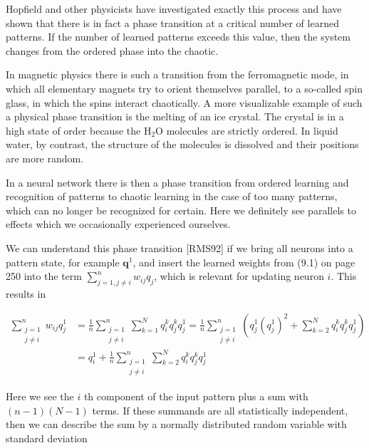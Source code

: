 \documentclass[10pt]{article}
\begin{document}
Hopfield and other physicists have investigated exactly this process and have shown that there is in fact a phase transition at a critical number of learned patterns. If the number of learned patterns exceeds this value, then the system changes from the ordered phase into the chaotic.

In magnetic physics there is such a transition from the ferromagnetic mode, in which all elementary magnets try to orient themselves parallel, to a so-called spin glass, in which the spins interact chaotically. A more visualizable example of such a physical phase transition is the melting of an ice crystal. The crystal is in a high state of order because the $\mathrm{H}_{2} \mathrm{O}$ molecules are strictly ordered. In liquid water, by contrast, the structure of the molecules is dissolved and their positions are more random.

In a neural network there is then a phase transition from ordered learning and recognition of patterns to chaotic learning in the case of too many patterns, which can no longer be recognized for certain. Here we definitely see parallels to effects which we occasionally experienced ourselves.

We can understand this phase transition [RMS92] if we bring all neurons into a pattern state, for example $\boldsymbol{q}^{1}$, and insert the learned weights from (9.1) on page 250 into the term $\sum_{j=1, j \neq i}^{n} w_{i j} q_{j}$, which is relevant for updating neuron $i$. This results in

$$
\begin{aligned}
\sum_{\substack{j=1 \\
j \neq i}}^{n} w_{i j} q_{j}^{1} & =\frac{1}{n} \sum_{\substack{j=1 \\
j \neq i}}^{n} \sum_{k=1}^{N} q_{i}^{k} q_{j}^{k} q_{j}^{1}=\frac{1}{n} \sum_{\substack{j=1 \\
j \neq i}}^{n}\left(q_{j}^{1}\left(q_{j}^{1}\right)^{2}+\sum_{k=2}^{N} q_{i}^{k} q_{j}^{k} q_{j}^{1}\right) \\
& =q_{i}^{1}+\frac{1}{n} \sum_{\substack{j=1 \\
j \neq i}}^{n} \sum_{k=2}^{N} q_{i}^{k} q_{j}^{k} q_{j}^{1}
\end{aligned}
$$

Here we see the $i$ th component of the input pattern plus a sum with $(n-1)(N-1)$ terms. If these summands are all statistically independent, then we can describe the sum by a normally distributed random variable with standard deviation
\end{document}
